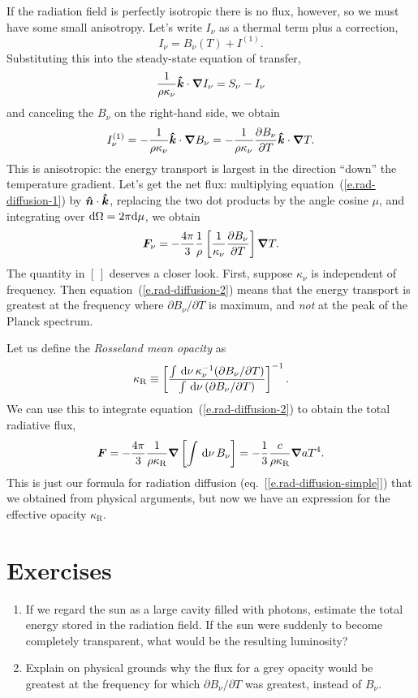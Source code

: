 If the radiation field is perfectly isotropic there is no flux, however, so we must have some small anisotropy. Let's write $I_{\nu}$ as a thermal term plus a correction, 
\[ I_{\nu} = B_{\nu}(T) + I^{(1)}. \]
Substituting this into the steady-state equation of transfer,
\[ \frac{1}{\rho\kappa_{\nu}}\boldsymbol{\hat{k}}\cdot\boldsymbol{\nabla} I_{\nu}  = S_{\nu} - I_{\nu}\]
and canceling the $B_{\nu}$ on the right-hand side, we obtain
\begin{equation}\label{e.rad-diffusion-1}
I_{\nu}^{(1)} = -\frac{1}{\rho\kappa_{\nu}} \boldsymbol{\hat{k}}\cdot\boldsymbol{\nabla} B_{\nu} = -\frac{1}{\rho\kappa_{\nu}} \frac{\partial B_{\nu}}{\partial T} \boldsymbol{\hat{k}}\cdot\boldsymbol{\nabla} T.
\end{equation}
This is anisotropic: the energy transport is largest in the direction ``down'' the temperature gradient. Let's get the net flux: multiplying equation~(\ref{e.rad-diffusion-1}) by $\boldsymbol{\hat{n}}\cdot\boldsymbol{\hat{k}}$, replacing the two dot products by the angle cosine $\mu$, and integrating over $\mathrm{d} \Omega = 2\pi \mathrm{d}\mu$, we obtain
\begin{equation}\label{e.rad-diffusion-2}
\boldsymbol{F}_{\nu} = -\frac{4\pi}{3}\frac{1}{\rho}\left[\frac{1}{\kappa_{\nu}}\frac{\partial B_{\nu}}{\partial T}\right]\boldsymbol{\nabla} T.
\end{equation}
The quantity in $[\,]$ deserves a closer look. First, suppose $\kappa_{\nu}$ is independent of frequency. Then equation~(\ref{e.rad-diffusion-2}) means that the energy transport is greatest at the frequency where $\partial B_{\nu}/\partial T$ is maximum, and \emph{not} at the peak of the Planck spectrum. 

Let us define the \emph{Rosseland mean opacity} as
\[ \kappa_{\mathrm{R}} \equiv \left[\frac{\int\,\mathrm{d}\nu\,\kappa_{\nu}^{-1}(\partial B_{\nu}/\partial T)}{\int \,\mathrm{d}\nu\, (\partial B_{\nu}/\partial T)}\right]^{-1}. \]
We can use this to integrate equation~(\ref{e.rad-diffusion-2}) to obtain the total radiative flux,
\begin{equation}\label{e.rad-flux}
\boldsymbol{F} = - \frac{4\pi}{3} \frac{1}{\rho\kappa_{\mathrm{R}}} \boldsymbol{\nabla}\left[\int\,\mathrm{d}\nu\,B_{\nu}\right] = - \frac{1}{3} \frac{c}{\rho\kappa_{\mathrm{R}}} \boldsymbol{\nabla} aT^{4}.
\end{equation}
This is just our formula for radiation diffusion (eq.~[\ref{e.rad-diffusion-simple}]) that we obtained from physical arguments, but now we have an expression for the effective opacity $\kappa_{\mathrm{R}}$.

\section{Exercises}
\begin{enumerate}
\item If we regard the sun as a large cavity filled with photons, estimate the total energy stored in the radiation field.  If the sun were suddenly to become completely transparent, what would be the resulting luminosity?

\item Explain on physical grounds why the flux for a grey opacity would be greatest at the frequency for which $\partial B_{\nu}/\partial T$ was greatest, instead of $B_{\nu}$.

\end{enumerate}
